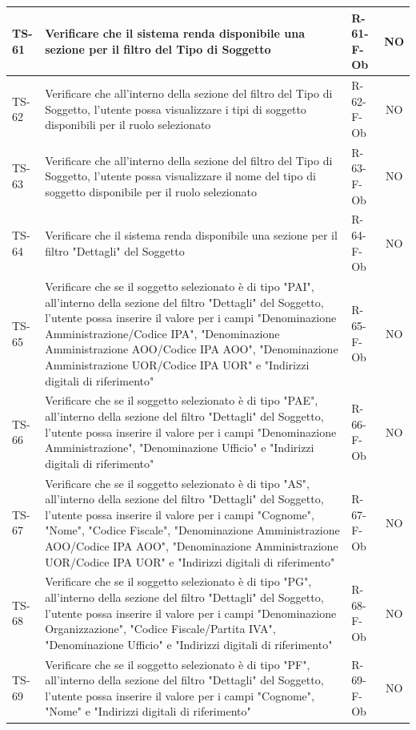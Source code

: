 \documentclass[a4paper,12pt]{article}
\begin{document}
\begin{longtable}{|p{1.5cm}|p{8.3cm}|p{2.4cm}|c|}
TS-61 & Verificare che il sistema renda disponibile una sezione per il filtro del Tipo di Soggetto & R-61-F-Ob & NO \\
\hline
TS-62 & Verificare che all'interno della sezione del filtro del Tipo di Soggetto, l'utente possa visualizzare i tipi di soggetto disponibili per il ruolo selezionato & R-62-F-Ob & NO \\
\hline
TS-63 & Verificare che all'interno della sezione del filtro del Tipo di Soggetto, l'utente possa visualizzare il nome del tipo di soggetto disponibile per il ruolo selezionato & R-63-F-Ob & NO \\
\hline
TS-64 & Verificare che il sistema renda disponibile una sezione per il filtro "Dettagli" del Soggetto & R-64-F-Ob & NO \\
\hline
TS-65 & Verificare che se il soggetto selezionato è di tipo "PAI", all'interno della sezione del filtro "Dettagli" del Soggetto, l'utente possa inserire il valore per i campi "Denominazione Amministrazione/Codice IPA", "Denominazione Amministrazione AOO/Codice IPA AOO", "Denominazione Amministrazione UOR/Codice IPA UOR" e "Indirizzi digitali di riferimento" & R-65-F-Ob & NO \\
\hline
TS-66 & Verificare che se il soggetto selezionato è di tipo "PAE", all'interno della sezione del filtro "Dettagli" del Soggetto, l'utente possa inserire il valore per i campi "Denominazione Amministrazione", "Denominazione Ufficio" e "Indirizzi digitali di riferimento" & R-66-F-Ob & NO \\
\hline
TS-67 & Verificare che se il soggetto selezionato è di tipo "AS", all'interno della sezione del filtro "Dettagli" del Soggetto, l'utente possa inserire il valore per i campi "Cognome", "Nome", "Codice Fiscale", "Denominazione Amministrazione AOO/Codice IPA AOO", "Denominazione Amministrazione UOR/Codice IPA UOR" e "Indirizzi digitali di riferimento" & R-67-F-Ob & NO \\
\hline
TS-68 & Verificare che se il soggetto selezionato è di tipo "PG", all'interno della sezione del filtro "Dettagli" del Soggetto, l'utente possa inserire il valore per i campi "Denominazione Organizzazione", "Codice Fiscale/Partita IVA", "Denominazione Ufficio" e "Indirizzi digitali di riferimento" & R-68-F-Ob & NO \\
\hline
TS-69 & Verificare che se il soggetto selezionato è di tipo "PF", all'interno della sezione del filtro "Dettagli" del Soggetto, l'utente possa inserire il valore per i campi "Cognome", "Nome" e "Indirizzi digitali di riferimento" & R-69-F-Ob & NO \\

\end{longtable}
\end{document}
